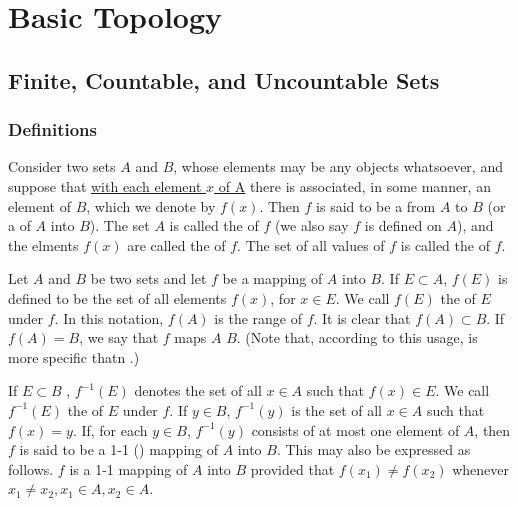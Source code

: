 \chapter{Basic Topology}

\section{Finite, Countable, and Uncountable Sets}

\subsection{Definitions}
\begin{definition}
	Consider two sets $A$ and $B$, whose elements may be any objects whatsoever, and suppose that {\underline{with each element $x$ of A}} there is associated, in some manner, an element of $B$, which we denote by $f(x)$. Then $f$ is said to be a {} from $A$ to $B$ (or a {} of $A$ into $B$). The set $A$ is called the {} of $f$ (we also say $f$ is defined on $A$), and the elments $f(x)$ are called the {} of $f$. The set of all values of $f$ is called the {} of $f$.
\end{definition}

\begin{definition}\label{def: mapping}
	Let $A$ and $B$ be two sets and let $f$ be a mapping of $A$ into $B$. If $E \subset A$, $f(E)$ is defined to be the set of all elements $f(x)$, for $x \in E$. We call $f(E)$ the {} of $E$ under $f$. In this notation, $f(A)$ is the range of $f$. It is clear that $f(A) \subset B$. If $f(A) = B$, we say that $f$ maps $A$ {} $B$. (Note that, according to this usage, {} is more specific thatn {}.)
\end{definition}

\begin{definition}
	If $E \subset B$ , $f^{-1}(E)$ denotes the set of all $x \in A$ such that $f(x) \in E$. We call $f^{-1}(E)$ the {} of $E$ under $f$. If $y \in B$, $f^{-1}(y)$ is the set of all $x \in A$ such that $f(x) = y$. If, for each $y \in B$, $f^{-1}(y)$ consists of at most one element of $A$, then $f$ is said to be a 1-1 ({}) mapping of $A$ into $B$. This may also be expressed as follows. $f$ is a 1-1 mapping of $A$ into $B$ provided that $f(x_1) \ne f(x_2)$ whenever $x_1 \ne x_2, x_1 \in A, x_2 \in A$.
\end{definition}

